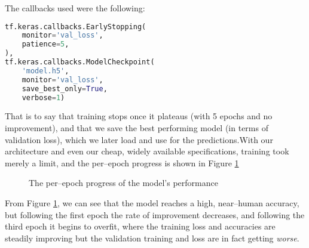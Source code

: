 \documentclass[conference]{IEEEtran}
\begin{document}
The callbacks used were the following:
\begin{lstlisting}[language=Python]
tf.keras.callbacks.EarlyStopping( 
    monitor='val_loss',
    patience=5,
),
tf.keras.callbacks.ModelCheckpoint( 
    'model.h5',
    monitor='val_loss',
    save_best_only=True,
    verbose=1)
\end{lstlisting}
That is to say that training stops once it plateaus (with 5 epochs and no improvement), and that we save the best performing model (in terms of validation loss), which we later load and use for the predictions.\@ With our architecture and even our cheap, widely available specifications, training took merely a limit, and the per--epoch progress is shown in Figure \ref{fig:perepoch}
\begin{figure}[!htp]
    \centering
    \scriptsize
    \caption{The per--epoch progress of the model's performance }\label{fig:perepoch}
\end{figure}
\par From Figure \ref{fig:perepoch}, we can see that the model reaches a high, near--human accuracy, but following the first epoch the rate of improvement decreases, and following the third epoch it begins to overfit, where the training loss and accuracies are steadily improving but the validation training and loss are in fact getting \textit{worse}.
\end{document}
